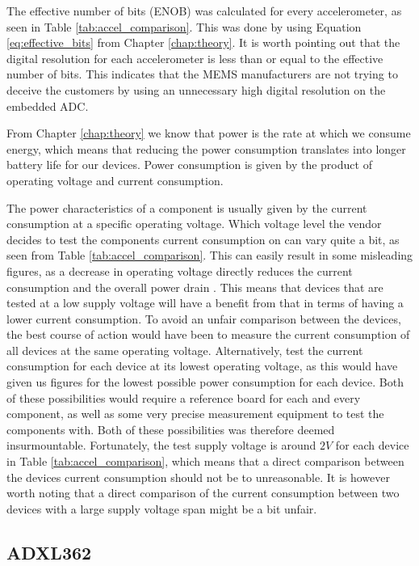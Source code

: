 The effective number of bits (ENOB) was calculated for every accelerometer, as seen in Table \ref{tab:accel_comparison}. This was done by using Equation \ref{eq:effective_bits} from Chapter \ref{chap:theory}. It is worth pointing out that the digital resolution for each accelerometer is less than or equal to the effective number of bits. This indicates that the MEMS manufacturers are not trying to deceive the customers by using an unnecessary high digital resolution on the embedded ADC.

From Chapter \ref{chap:theory} we know that power is the rate at which we consume energy, which means that reducing the power consumption translates into longer battery life for our devices. Power consumption is given by the product of operating voltage and current consumption. 

The power characteristics of a component is usually given by the current consumption at a specific operating voltage. Which voltage level the vendor decides to test the components current consumption on can vary quite a bit, as seen from Table \ref{tab:accel_comparison}. This can easily result in some misleading figures, as a decrease in operating voltage directly reduces the current consumption and the overall power drain \cite[~p.3]{holberg06}. This means that devices that are tested at a low supply voltage will have a benefit from that in terms of having a lower current consumption. To avoid an unfair comparison between the devices, the best course of action would have been to measure the current consumption of all devices at the same operating voltage. Alternatively, test the current consumption for each device at its lowest operating voltage, as this would have given us figures for the lowest possible power consumption for each device. Both of these possibilities would require a reference board for each and every component, as well as some very precise measurement equipment to test the components with. Both of these possibilities was therefore deemed insurmountable. Fortunately, the test supply voltage is around $2V$ for each device in Table \ref{tab:accel_comparison}, which means that a direct comparison between the devices current consumption should not be to unreasonable. It is however worth noting that a direct comparison of the current consumption between two devices with a large supply voltage span might be a bit unfair.

\subsection{ADXL362}

